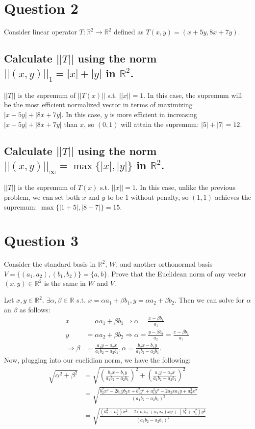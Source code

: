 \documentclass[11pt]{article} %
\begin{document}
\section{Question 2}
Consider linear operator $T: \mathbb{R}^2 \rightarrow \mathbb{R}^2$ defined as $T(x,y) = (x+5y,8x+7y)$.
\subsection{Calculate $||T||$ using the norm $||(x,y)||_1 = |x| + |y|$ in $\mathbb{R}^2$.}
$||T||$ is the supremum of $||T(x)||$ s.t. $||x||=1$. In this case, the supremum will be the most efficient normalized vector in terms of maximizing $|x+5y| + |8x + 7y|.$ In this case, $y$ is more efficient in increasing $|x+5y| + |8x + 7y|$ than $x$, so $(0,1)$ will attain the supremum: $|5|+|7| = 12.$
\subsection{Calculate $||T||$ using the norm $||(x,y)||_{\infty} = \max \{|x|,|y| \}$ in $\mathbb{R}^2$.}
$||T||$ is the supremum of $T(x)$ s.t. $||x||=1$. In this case, unlike the previous problem, we can set both $x$ and $y$ to be $1$ without penalty, so $(1,1)$ achieves the supremum: $\max \{ |1 + 5|,|8 + 7|\} = 15.$

\section{Question 3}
Consider the standard basis in $\mathbb{R}^2$, $W$, and another orthonormal basis $V = \{ (a_1,a_2),(b_1,b_2)\} = \{a,b\}$. Prove that the Euclidean norm of any vector $(x,y) \in \mathbb{R}^2$ is the same in $W$ and $V$.

Let $x,y \in \mathbb{R}^2.$ $\exists \alpha,\beta \in \mathbb{R}$ s.t. $x = \alpha a_1 + \beta b_1, y = \alpha a_2 + \beta b_2.$ Then we can solve for $\alpha$ an $\beta$ as follows:
\begin{align*}
x &= \alpha a_1 + \beta b_1 \Rightarrow \alpha = \frac{x - \beta b_1}{a_1} \\
y &= \alpha a_2 + \beta b_2 \Rightarrow  \alpha = \frac{y - \beta b_2}{a_2}  = \frac{x - \beta b_1}{a_1}\\
\Rightarrow \beta &= \frac{a_1y - a_2x }{a_1 b_2 - a_2 b_1}, \alpha = \frac{b_2 x - b_1 y}{a_1 b_2 - a_2 b_1}.
\end{align*}
Now, plugging into our euclidian norm, we have the following:
\begin{align*}
\sqrt{\alpha^2 + \beta^2} &= \sqrt{\left(  \frac{b_2 x - b_1 y}{a_1 b_2 - a_2 b_1}\right)^{2} + \left( \frac{a_1y - a_2x }{a_1 b_2 - a_2 b_1}  \right)^{2}} \\
&= \sqrt{\frac{b_{2}^{2} x^2 - 2 b_1 y b_2 x + b_{1}^{2} y^{2} + a_{1}^{2} y^2 -2 a_{2} x a_1 y + a_{2}^{2} x^2}{\left( a_1 b_2 - a_2 b_1\right)^2}} \\
&= \sqrt{\frac{(b_{2}^{2} + a_{2}^{2}) x^2 -2 (b_1b_2 + a_1a_2) xy + (b_{1}^{2} + a_{1}^{2}) y^2}{\left( a_1 b_2 - a_2 b_1\right)^2}}
\end{align*}
\end{document}
